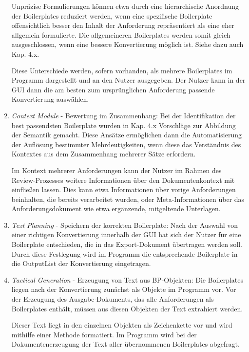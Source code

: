 \documentclass[12pt]{report}
\begin{document}
\begin{enumerate}
Unpräzise Formulierungen können etwa durch eine hierarchische Anordnung der Boilerplates reduziert werden, wenn eine spezifische Boilerplate offensichtlich besser den Inhalt der Anforderung repräsentiert als eine eher allgemein formulierte. Die allgemeineren Boilerplates werden somit gleich ausgeschlossen, wenn eine bessere Konvertierung möglich ist. Siehe dazu auch Kap. 4.x.

Diese Unterschiede werden, sofern vorhanden, als mehrere Boilerplates im Programm dargestellt und an den Nutzer ausgegeben. Der Nutzer kann in der GUI dann die am besten zum ursprünglichen Anforderung passende Konvertierung auswählen.

\item \textit{Context Module} - Bewertung im Zusammenhang: Bei der Identifikation der best passendsten Boilerplate wurden in Kap. 4.x Vorschläge zur Abbildung der Semantik gemacht. Diese Ansätze ermöglichen dann die Automatisierung der Auflösung bestimmter Mehrdeutigkeiten, wenn diese das Verständnis des Kontextes aus dem Zusammenhang mehrerer Sätze erfordern. 

Im Kontext mehrerer Anforderungen kann der Nutzer im Rahmen des Review-Prozesses weitere Informationen über den Dokumentenkontext mit einfließen lassen. Dies kann etwa Informationen über vorige Anforderungen beinhalten, die bereits verarbeitet wurden, oder Meta-Informationen über das Anforderungsdokument wie etwa ergänzende, mitgeltende Unterlagen.

\item \textit{Text Planning} - Speichern der korrekten Boilerplate: Nach der Auswahl von einer richtigen Konvertierung innerhalb der GUI hat sich der Nutzer für eine Boilerplate entschieden, die in das Export-Dokument übertragen werden soll. Durch diese Festlegung wird im Programm die entsprechende Boilerplate in die OutputList der Konvertierung eingetragen.

\item \textit{Tactical Generation} - Erzeugung von Text aus BP-Objekten: Die Boilerplates liegen nach der Konvertierung zunächst als Objekte im Programm vor. Vor der Erzeugung des Ausgabe-Dokuments, das alle Anforderungen als Boilerplates enthält, müssen aus diesen Objekten der Text extrahiert werden. 

Dieser Text liegt in den einzelnen Objekten als Zeichenkette vor und wird mithilfe einer Methode formatiert. Im Programm wird bei der Dokumentenerzeugung der Text aller übernommenen Boilerplates abgefragt.


\end{enumerate}
\end{document}
